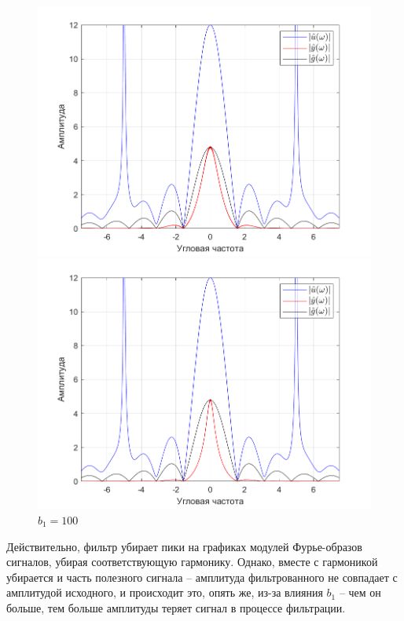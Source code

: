 \documentclass[a4paper]{article}
\begin{document}
\begin{figure}[H]
    \begin{minipage}{0.5\textwidth}
        \centering
        \includegraphics[width=\linewidth]{ex1_2/приближение/a1=0_a2=25_b1=50_b2=25_d=5/h4.png}
        \caption{$b_1=50$}
    \end{minipage}
    \begin{minipage}{0.5\textwidth}
        \centering
        \includegraphics[width=\linewidth]{ex1_2/приближение/a1=0_a2=25_b1=100_b2=25_d=5/h4.png}
        \caption{$b_1=100$}
    \end{minipage}
\end{figure}

Действительно, фильтр убирает пики на графиках модулей Фурье-образов сигналов, убирая соответствующую гармонику. Однако, вместе с гармоникой убирается и часть полезного сигнала -- амплитуда фильтрованного не совпадает с амплитудой исходного, и происходит это, опять же, из-за влияния $b_1$ -- чем он больше, тем больше амплитуды теряет сигнал в процессе фильтрации. 
\end{document}
